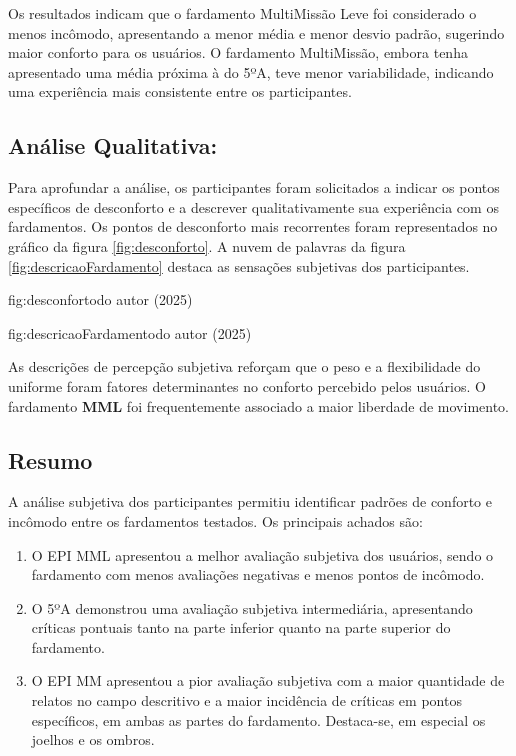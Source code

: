         Os resultados indicam que o fardamento MultiMissão Leve foi considerado o menos incômodo, 
        apresentando a menor média e menor desvio padrão, sugerindo maior conforto para os usuários. 
        O fardamento MultiMissão, embora tenha apresentado uma média próxima à do 5ºA, teve menor 
        variabilidade, indicando uma experiência mais consistente entre os participantes.
            


 
    \subsection{ Análise Qualitativa:}
        Para aprofundar a análise, os participantes foram solicitados a indicar os pontos específicos 
        de desconforto e a descrever qualitativamente sua experiência com os fardamentos. Os pontos 
        de desconforto mais recorrentes foram representados no gráfico da figura \ref{fig:desconforto}. 
        A nuvem de palavras da figura \ref{fig:descricaoFardamento} destaca as sensações subjetivas 
        dos participantes. 
        
        {fig:desconforto}{}{do autor (2025)}

        {fig:descricaoFardamento}{}{do autor (2025)}

        As descrições de percepção subjetiva reforçam que o peso e a flexibilidade do uniforme foram 
        fatores determinantes no conforto percebido pelos usuários. O fardamento \textbf{\acrlong{MML}} foi 
        frequentemente associado a maior liberdade de movimento.
    \subsection{Resumo}
    A análise subjetiva dos participantes permitiu identificar padrões de conforto e incômodo entre 
    os fardamentos testados. Os principais achados são:

    \begin{enumerate}[label=\Roman*.] %
        \item O \acrshort{EPI} \acrlong{MML} apresentou a melhor avaliação subjetiva dos usuários, 
        sendo o fardamento com menos avaliações negativas e menos pontos de incômodo.
        \item O 5ºA demonstrou uma avaliação subjetiva intermediária, apresentando críticas 
        pontuais tanto na parte inferior quanto na parte superior do fardamento.
        \item O \acrshort{EPI} \acrlong{MM} apresentou a pior avaliação subjetiva 
        com a maior quantidade de relatos no campo descritivo e a maior incidência de críticas em 
        pontos específicos, em ambas as partes do fardamento. Destaca-se, em especial os joelhos 
        e os ombros.
        \end{enumerate}
